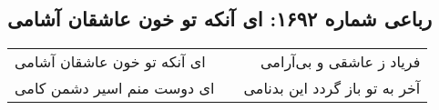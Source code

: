 \begin{center}
\section*{رباعی شماره ۱۶۹۲: ای آنکه تو خون عاشقان آشامی}
\label{sec:1692}
\begin{longtable}{l p{0.5cm} r}
ای آنکه تو خون عاشقان آشامی
&&
فریاد ز عاشقی و بی‌آرامی
\\
ای دوست منم اسیر دشمن کامی
&&
آخر به تو باز گردد این بدنامی
\\
\end{longtable}
\end{center}
